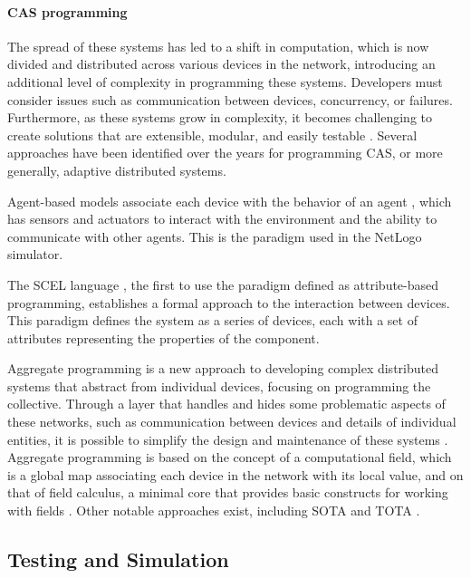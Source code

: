 \documentclass[12pt,a4paper,openright,twoside]{book}
\begin{document}
\paragraph*{CAS programming}
The spread of these systems has led to a shift in computation, which is now divided and distributed across various devices in the network, introducing an additional level of complexity in programming these systems.
Developers must consider issues such as communication between devices, concurrency, or failures. 
Furthermore, as these systems grow in complexity, it becomes challenging to create solutions that are extensible, modular, and easily testable \cite{DBLP:conf/ecoop/CasadeiV16}.
Several approaches have been identified over the years for programming \ac*{CAS}, or more generally, adaptive distributed systems.

Agent-based models \cite{MacalN10} associate each device with the behavior of an agent \cite{RussellN95}, which has sensors and actuators to interact with the environment and the ability to communicate with other agents. 
This is the paradigm used in the NetLogo simulator. 

The SCEL language \cite{NicolaLPT14}, the first to use the paradigm defined as attribute-based programming, establishes a formal approach to the interaction between devices. 
This paradigm defines the system as a series of devices, each with a set of attributes representing the properties of the component.

Aggregate programming is a new approach to developing complex distributed systems that abstract from individual devices, focusing on programming the collective.
Through a layer that handles and hides some problematic aspects of these networks, such as communication between devices and details of individual entities,
it is possible to simplify the design and maintenance of these systems \cite{DBLP:journals/computer/BealPV15, DBLP:conf/sfm/BealV16}.
Aggregate programming is based on the concept of a computational field, which is a global map associating each device in the network with its local value,
and on that of field calculus, a minimal core that provides basic constructs for working with fields \cite{DBLP:journals/corr/ViroliADPB16}.
Other notable approaches exist, including SOTA \cite{AbeywickramaBMZ20} and TOTA \cite{MameiVZ04}. 

\subsection{Testing and Simulation}
\end{document}
